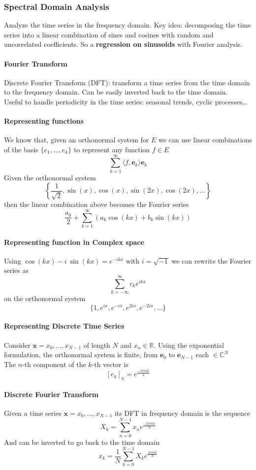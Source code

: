 \documentclass[10pt]{report}
\begin{document}
\subsubsection{Spectral Domain Analysis}
Analyze the time series in the frequency domain. Key idea: decomposing the time series into a linear combination of sines and cosines with random and uncorrelated coefficients. So a \textbf{regression on sinusoids} with Fourier analysis.
\paragraph{Fourier Transform} Discrete Fourier Transform (DFT): transform a time series from the time domain to the frequency domain. Can be easily inverted back to the time domain.\\
Useful to handle periodicity in the time series: seasonal trends, cyclic processes\ldots
\paragraph{Representing functions} We know that, given an orthonormal system for $E$ we can use linear combinations of the basis $\{e_1,\ldots,e_k\}$ to represent any function $f\in E$ $$\sum_{k=1}^\infty \langle f,\mathbf{e}_k\rangle \mathbf{e}_k$$
Given the orthonormal system $$\left\{\frac{1}{\sqrt{2}}, \sin(x),\cos(x),\sin(2x),\cos(2x),\ldots\right\}$$
then the linear combination above becomes the Fourier series 
$$\frac{a_0}{2}+\sum_{k=1}^\infty\left(a_k\cos(kx)+b_k\sin(kx)\right)$$
\paragraph{Representing function in Complex space} Using $\cos(kx)-i\:\sin(kx) = e^{-ikx}$ with $i=\sqrt{-1}$ we can rewrite the Fourier series as $$\sum_{k=-\infty}^\infty c_k e^{ikx}$$
on the orthonormal system $$\{1,e^{ix},e^{-ix},e^{2ix},e^{-2ix},\ldots\}$$
\paragraph{Representing Discrete Time Series} Consider $\mathbf{x}=x_0,\ldots,x_{N-1}$ of length $N$ and $x_n\in \mathbb{R}$. Using the exponential formulation, the orthonormal system is finite, from $\mathbf{e}_0$ to $\mathbf{e}_{N-1}$ each $\in \mathbb{C}^N$\\
The $n$-th component of the $k$-th vector is $$[e_k]_n=e^{\frac{-2\pi ink}{2}}$$
\paragraph{Discrete Fourier Transform} Given a time series $\mathbf{x} = x_0,\ldots,x_{N-1}$ its DFT in frequency domain is the sequence $$X_k = \sum_{n=0}^{N-1}x_ne^{\frac{-2\pi ink}{N}}$$
And can be inverted to go back to the time domain $$x_k = \frac{1}{N}\sum_{k=0}^{N-1}X_ke^{\frac{2\pi ink}{N}}$$
\end{document}
